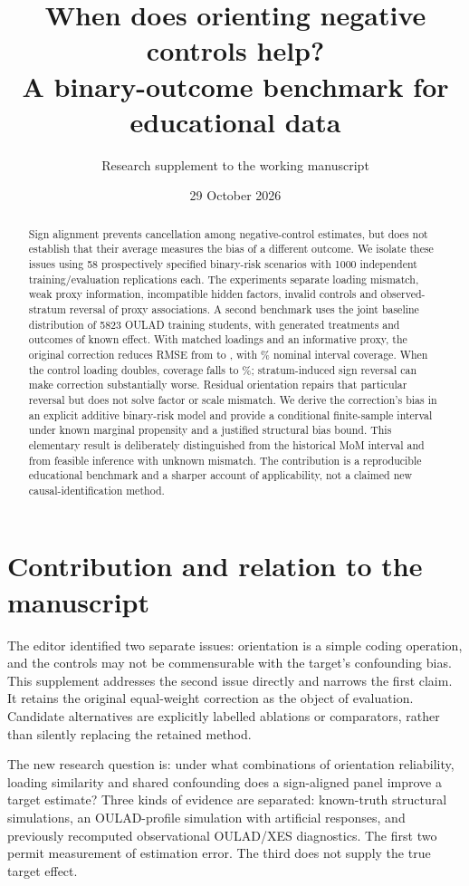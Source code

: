 \documentclass[11pt,a4paper]{article}
\title{When does orienting negative controls help?\\A binary-outcome benchmark for educational data}
\author{Research supplement to the working manuscript}
\date{29 October 2026}
\begin{document}
\maketitle
\begin{abstract}
Sign alignment prevents cancellation among negative-control estimates, but does not establish that their average measures the bias of a different outcome. We isolate these issues using 58 prospectively specified binary-risk scenarios with 1000 independent training/evaluation replications each. The experiments separate loading mismatch, weak proxy information, incompatible hidden factors, invalid controls and observed-stratum reversal of proxy associations. A second benchmark uses the joint baseline distribution of 5823 OULAD training students, with generated treatments and outcomes of known effect. With matched loadings and an informative proxy, the original correction reduces RMSE from \MatchedBaseRMSE{} to \MatchedRMSE{}, with \MatchedCoverage\% nominal interval coverage. When the control loading doubles, coverage falls to \DoubleCoverage\%; stratum-induced sign reversal can make correction substantially worse. Residual orientation repairs that particular reversal but does not solve factor or scale mismatch. We derive the correction's bias in an explicit additive binary-risk model and provide a conditional finite-sample interval under known marginal propensity and a justified structural bias bound. This elementary result is deliberately distinguished from the historical MoM interval and from feasible inference with unknown mismatch. The contribution is a reproducible educational benchmark and a sharper account of applicability, not a claimed new causal-identification method.
\end{abstract}

\section{Contribution and relation to the manuscript}

The editor identified two separate issues: orientation is a simple coding operation, and the controls may not be commensurable with the target's confounding bias. This supplement addresses the second issue directly and narrows the first claim. It retains the original equal-weight correction as the object of evaluation. Candidate alternatives are explicitly labelled ablations or comparators, rather than silently replacing the retained method.

The new research question is: under what combinations of orientation reliability, loading similarity and shared confounding does a sign-aligned panel improve a target estimate? Three kinds of evidence are separated: known-truth structural simulations, an OULAD-profile simulation with artificial responses, and previously recomputed observational OULAD/XES diagnostics. The first two permit measurement of estimation error. The third does not supply the true target effect.
\end{document}
